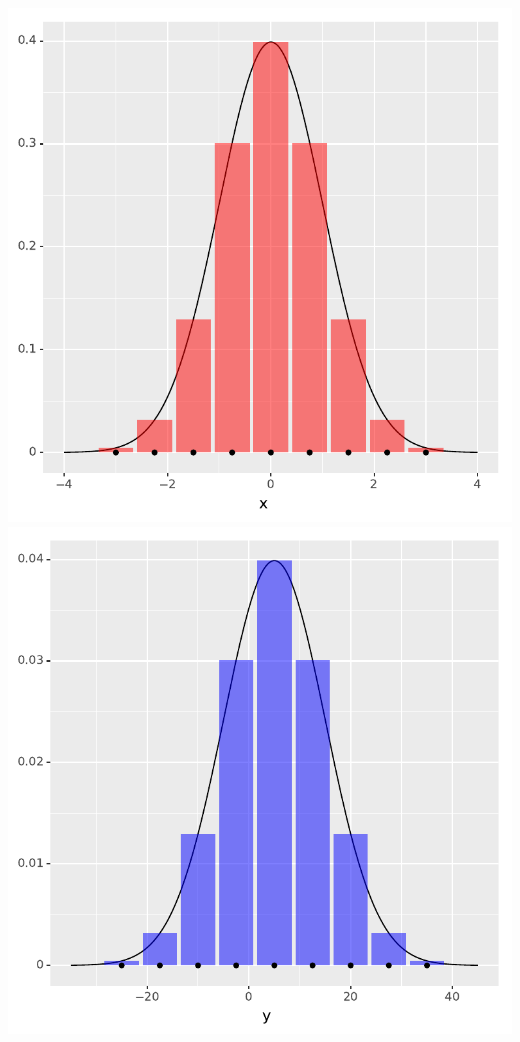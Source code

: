 \documentclass[landscape,footrule]{foils}
\begin{document}
\centerline{
\includegraphics[scale=0.5]{1d_source_distribution}\hspace*{1cm}
\includegraphics[scale=0.5]{1d_target_distribution}}
\end{document}
